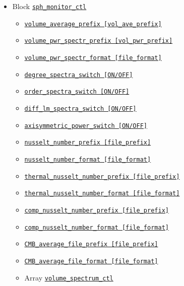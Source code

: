 \begin{itemize}
\begin{itemize}
\begin{itemize}
		\end{itemize}
%
	\end{itemize}
%
\item Block \hyperref[href_t:sph_monitor_ctl]{\tt sph\_monitor\_ctl}
	\begin{itemize} \label{href_i:sph_monitor_ctl}
	\item \hyperref[href_t:volume_average_prefix]
			{\tt volume\_average\_prefix        [vol\_ave\_prefix]}
	\item \hyperref[href_t:volume_pwr_spectr_prefix]
			{\tt volume\_pwr\_spectr\_prefix    [vol\_pwr\_prefix]}
	\item \hyperref[href_t:volume_pwr_spectr_format]
		{\tt volume\_pwr\_spectr\_format    [file\_format]}
	\item \hyperref[href_t:degree_spectra_switch]
		{\tt degree\_spectra\_switch           [ON/OFF]}
	\item \hyperref[href_t:order_spectra_switch]
		{\tt order\_spectra\_switch           [ON/OFF]}
	\item \hyperref[href_t:diff_lm_spectra_switch]
		{\tt diff\_lm\_spectra\_switch           [ON/OFF]}
	\item \hyperref[href_t:axisymmetric_power_switch]
		{\tt axisymmetric\_power\_switch           [ON/OFF]}
%
	\item \hyperref[href_t:nusselt_number_prefix]
			{\tt nusselt\_number\_prefix        [file\_prefix]}
	\item \hyperref[href_t:nusselt_number_format]
			{\tt nusselt\_number\_format        [file\_format]}
%
	\item \hyperref[href_t:nusselt_number_prefix]
			{\tt thermal\_nusselt\_number\_prefix    [file\_prefix]}
	\item \hyperref[href_t:nusselt_number_format]
			{\tt thermal\_nusselt\_number\_format    [file\_format]}
	\item \hyperref[href_t:comp_nusselt_number_prefix]
			{\tt comp\_nusselt\_number\_prefix       [file\_prefix]}
	\item \hyperref[href_t:comp_nusselt_number_format]
			{\tt comp\_nusselt\_number\_format       [file\_format]}
	\item \hyperref[href_t:CMB_average_file_prefix]
			{\tt CMB\_average\_file\_prefix          [file\_prefix]}
	\item \hyperref[href_t:CMB_average_file_format]
			{\tt CMB\_average\_file\_format          [file\_format]}
%
	\item Array \hyperref[href_t:volume_spectrum_ctl]{\tt volume\_spectrum\_ctl}

\end{itemize}
\end{itemize}
